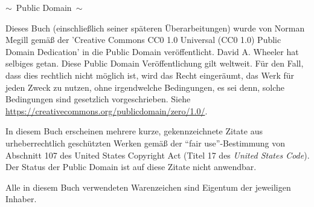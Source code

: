 \begin{center}
$\sim$\ {\sc Public Domain}\ $\sim$

\vspace{2ex}
Dieses Buch (einschließlich seiner späteren Überarbeitungen) wurde von Norman Megill gemäß der 'Creative Commons CC0 1.0 Universal (CC0 1.0) Public Domain Dedication' in die Public Domain veröffentlicht. 
David A. Wheeler hat selbiges getan. Diese Public Domain Veröffentlichung gilt weltweit. Für den Fall, dass dies rechtlich nicht möglich ist, wird das Recht eingeräumt, das Werk für jeden Zweck zu nutzen, ohne irgendwelche Bedingungen, es sei denn, solche Bedingungen sind gesetzlich vorgeschrieben.
Siehe \url{https://creativecommons.org/publicdomain/zero/1.0/}.

\vspace{3ex}
In diesem Buch erscheinen mehrere kurze, gekennzeichnete Zitate aus urheberrechtlich geschützten Werken gemäß der "`fair use"'-Bestimmung von Abschnitt 107 des United States Copyright Act (Titel 17 des {\em United States Code}). Der Status der Public Domain ist auf diese Zitate nicht anwendbar.

\vspace{3ex}
Alle in diesem Buch verwendeten Warenzeichen sind Eigentum der jeweiligen Inhaber.


%
%
%
%


\end{center}
